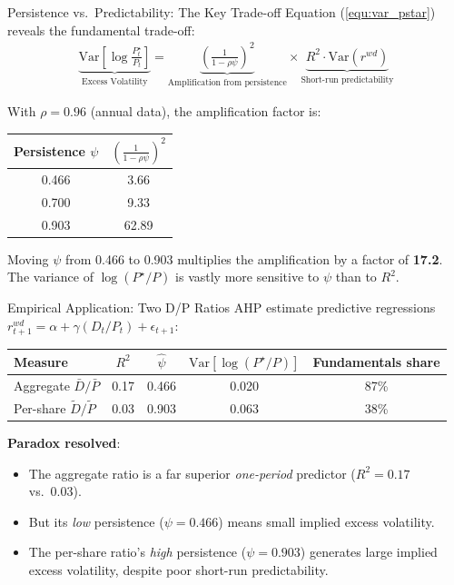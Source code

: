\documentclass{beamer}
\begin{document}
\begin{frame}{Persistence vs.\ Predictability: The Key Trade-off}
	Equation (\ref{equ:var_pstar}) reveals the fundamental trade-off:
	\begin{align*}
		\underbrace{\text{Var}\left[\log\frac{P_t^\star}{P_t}\right]}_{\text{Excess Volatility}} = \underbrace{\left(\frac{1}{1-\rho\psi}\right)^2}_{\text{Amplification from persistence}} \times \underbrace{R^2 \cdot \text{Var}(r^{wd})}_{\text{Short-run predictability}}
	\end{align*}

	With $\rho = 0.96$ (annual data), the amplification factor is:
	\begin{center}
		\begin{tabular}{cc}
			\hline
			Persistence $\psi$ & $\left(\frac{1}{1-\rho\psi}\right)^2$ \\
			\hline
			0.466 & 3.66 \\
			0.700 & 9.33 \\
			0.903 & 62.89 \\
			\hline
		\end{tabular}
	\end{center}
	Moving $\psi$ from 0.466 to 0.903 multiplies the amplification by a factor of \textbf{17.2}. The variance of $\log(P^\star/P)$ is vastly more sensitive to $\psi$ than to $R^2$.
\end{frame}

\begin{frame}{Empirical Application: Two D/P Ratios}
	AHP estimate predictive regressions $r_{t+1}^{wd} = \alpha + \gamma (D_t/P_t) + \epsilon_{t+1}$:

	\begin{center}
		\small
		\begin{tabular}{lcccc}
			\hline
			Measure & $R^2$ & $\hat{\psi}$ & $\text{Var}[\log(P^\star/P)]$ & Fundamentals share \\
			\hline
			Aggregate $\bar{D}/\bar{P}$ & 0.17 & 0.466 & 0.020 & 87\% \\
			Per-share $\tilde{D}/\tilde{P}$ & 0.03 & 0.903 & 0.063 & 38\% \\
			\hline
		\end{tabular}
	\end{center}

	\vspace{5pt}
	\textbf{Paradox resolved}:
	\begin{itemize}
		\item The aggregate ratio is a far superior \textit{one-period} predictor ($R^2 = 0.17$ vs.\ 0.03).
		\item But its \textit{low} persistence ($\psi = 0.466$) means small implied excess volatility.
		\item The per-share ratio's \textit{high} persistence ($\psi = 0.903$) generates large implied excess volatility, despite poor short-run predictability.
	\end{itemize}
\end{frame}
\end{document}
